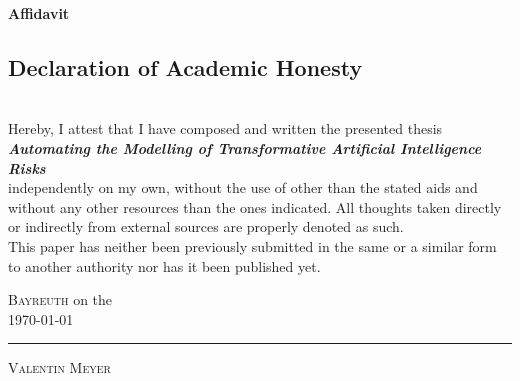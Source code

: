 \documentclass[
  11pt,
  letterpaper,
]{book}
\begin{document}

  \LARGE\textbf{Affidavit}
\vspace{1.5cm}

\center

\normalsize


    \subsection*{\Large Declaration of Academic Honesty}
	    \vspace{1cm}\noindent \\
	    Hereby, I attest that I have composed and written the presented thesis 
        \vspace*{0.5cm}\noindent \\
        \textit{ \textbf{ Automating the Modelling of Transformative Artificial Intelligence Risks }}
        \vspace*{0.5cm}\noindent \\
        independently on my own, without the use of other than the stated aids and without any other resources than the ones indicated. All thoughts taken directly or indirectly from external sources are properly denoted as such.
	    \vspace{\baselineskip}
	    \\  This paper has neither been previously submitted in the same or a similar form to another authority nor has it been published yet.
	    \vspace{2cm}
	    
    \flushright
    \begin{minipage}{0.5\textwidth}
        \begin{flushleft} \large
        \textsc{Bayreuth}                     %
        on the \\ %
        \today           %
        \vspace{2cm}\\
    	{\rule[-3pt]{\linewidth}{.4pt}\par\smallskip  
        \textsc{Valentin Meyer}	\\         %
    	}
        \end{flushleft}
        \end{minipage}
\end{document}
